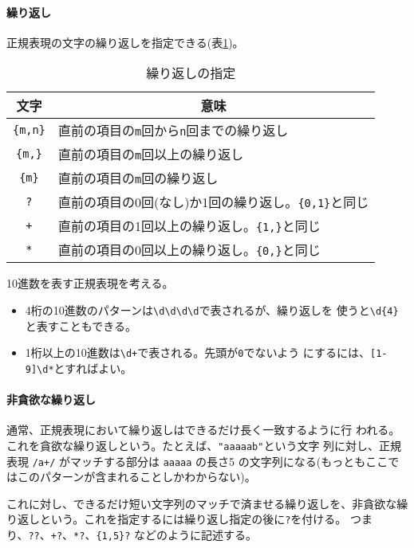 \paragraph{繰り返し}
正規表現の文字の繰り返しを指定できる(表\ref{repeat})。
\begin{table}[ht]
\caption{繰り返しの指定}\label{repeat}
\begin{center}
 \begin{tabular}{|c|l|}\hline
  文字&\multicolumn{1}{c|}{意味}\\\hline
\Verb+{m,n}+&直前の項目の\texttt{m}回から\texttt{n}回までの繰り返し\\\hline
\Verb+{m,}+&直前の項目の\texttt{m}回以上の繰り返し\\\hline
\Verb+{m}+&直前の項目の\texttt{m}回の繰り返し\\\hline
\Verb+?+&直前の項目の0回(なし)か1回の繰り返し。\Verb+{0,1}+と同じ\\\hline
\Verb-+-&直前の項目の1回以上の繰り返し。\Verb+{1,}+と同じ\\\hline
\Verb+*+&直前の項目の0回以上の繰り返し。\Verb+{0,}+と同じ\\\hline
\end{tabular}
\end{center}
\end{table}

\begin{Exec}\upshape 10進数を表す正規表現を考える。
\begin{itemize}
 \item 4桁の10進数のパターンは\Verb+\d\d\d\d+で表されるが、繰り返しを
       使うと\Verb+\d{4}+と表すこともできる。
 \item 1桁以上の10進数は\Verb-\d+-で表される。先頭が\texttt{0}でないよう
       にするには、\Verb+[1-9]\d*+とすればよい。
\end{itemize}
\end{Exec}
\paragraph{非貪欲な繰り返し}
通常、正規表現において繰り返しはできるだけ長く一致するように行
われる。これを貪欲な繰り返しという。たとえば、\Verb+"aaaaab"+という文字
列に対し、正規表現 \Verb-/a+/- がマッチする部分は \Verb+aaaaa+ の長さ5
の文字列になる(もっともここではこのパターンが含まれることしかわからない)。

これに対し、できるだけ短い文字列のマッチで済ませる繰り返しを、非貪欲な繰
り返しという。これを指定するには繰り返し指定の後に\Verb+?+を付ける。
つまり、\Verb-??-、\Verb-+?-、\Verb-*?-、\Verb-{1,5}?- などのように記述する。

